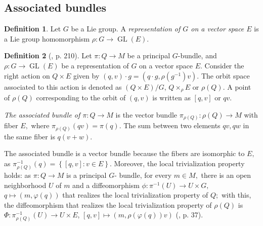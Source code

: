 \documentclass[12pt, letterpaper, reqno]{amsart}
\theoremstyle{definition}
\newtheorem{df}{Definition}
\theoremstyle{plain}
\theoremstyle{remark}
\begin{document}
 \subsection{Associated bundles}%
 \label{sub:associated_bundles}

\begin{df}
	Let $ G $ be a Lie group. A \textit{representation of $ G $ on a vector space $ E $} is a Lie group homomorphism $ \rho: G \rightarrow \operatorname{GL} (E). $ 
\end{df}

\begin{df}[\cite{montgomery2002tour}, p. 210]
	Let $ \pi: Q \rightarrow M $ be a principal $ G $-bundle, and $ \rho: G \rightarrow \operatorname{GL}(E) $ be a representation of $ G $ on a vector space $ E. $ Consider the right action on $ Q\times E $ given by $ (q,v)\cdot g = (q\cdot g, \rho(g^{-1})v). $  The orbit space associated to this action is denoted as $ (Q\times E)/G $, $ Q\times_\rho E $ or $ \rho(Q). $  A point of $ \rho(Q) $ corresponding to the orbit of $ (q,v) $ is written as $ [q,v] $ or $ qv. $  

	\textit{The associated bundle of $ \pi:Q \rightarrow M $ } is the vector bundle $ \pi_{ \rho(Q)}: \rho(Q) \rightarrow M $ with fiber $ E, $ where $ \pi_{\rho(Q)}(qv)=\pi(q). $ The sum between two elements $ qv,qw$ in the same fiber is $ q(v+w). $  
\end{df}

The associated bundle is a vector bundle because the fibers are isomorphic to $ E, $ as $ \pi_{\rho(Q)}^{-1}(q)= \left\{ [q,v]: v\in E \right\}.  $ Moreover, the local trivialization property holds: as $ \pi: Q \rightarrow M $ is a principal $ G $- bundle, for every $ m\in M, $ there is an open neighborhood $ U $ of $ m $ and a diffeomorphism $ \phi: \pi^{-1}(U) \rightarrow U \times G, $ $ q \mapsto (m, \varphi(q)) $ that realizes the local trivialization property of $ Q; $ with this, the diffeomorphism that realizes the local trivialization property of $ \rho(Q) $ is $ \Phi: \pi_{\rho(Q)}^{-1}(U) \rightarrow U\times E $, $ [q,v] \mapsto (m, \rho(\varphi(q))v) $ (\cite{sharpe2000differential}, p. 37).  
\end{document}
